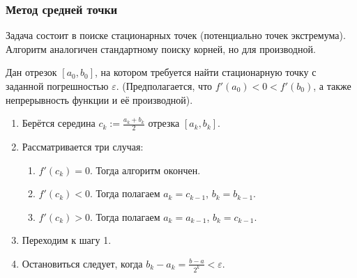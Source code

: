 \subsubsection{Метод средней точки}
Задача состоит в поиске стационарных точек (потенциально точек экстремума).
Алгоритм аналогичен стандартному поиску корней, но для производной.
\begin{alg}
  Дан отрезок $ [a_0,b_0] $, на котором требуется найти стационарную точку с
  заданной погрешностью $ \varepsilon $. (Предполагается, что $ f'(a_0) < 0 <
  f'(b_0) $, а также непрерывность функции и её производной).
  \begin{enumerate}
    \item Берётся середина $ c_k := \frac{a_k + b_k}{2} $ отрезка $ [a_k, b_k] $.
    \item Рассматривается три случая:
      \begin{enumerate}
        \item $ f'(c_k) = 0 $. Тогда алгоритм окончен.
        \item $f'(c_k) < 0$. Тогда полагаем $ a_k = c_{k-1} $, $ b_k = b_{k-1}
          $.
        \item $f'(c_k) > 0$. Тогда полагаем $ a_k = a_{k-1} $, $ b_k = c_{k-1}
          $.
      \end{enumerate}
    \item Переходим к шагу 1.
    \item Остановиться следует, когда $ b_k - a_k = \frac{b - a}{2^k} < \varepsilon $.
  \end{enumerate}
\end{alg}
